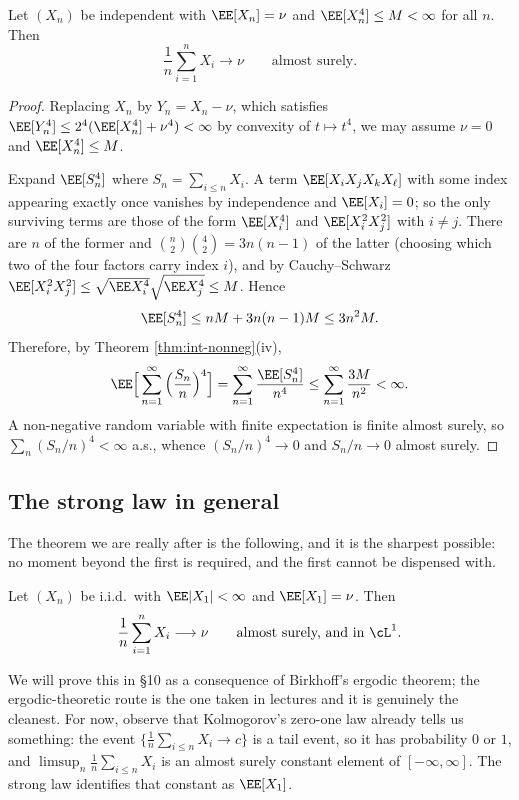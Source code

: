 \begin{theorem}\label{thm:slln4}
	Let $(X_n)$ be independent with $\EE[X_n]=\nu$ and $\EE[X_n^4]\leq M<\infty$ for all $n$. Then
	$$
	\frac{1}{n}\sum_{i=1}^n X_i \longrightarrow \nu \qquad \text{almost surely.}
	$$
\end{theorem}
\begin{proof}
	Replacing $X_n$ by $Y_n = X_n - \nu$, which satisfies $\EE[Y_n^4]\leq 2^4(\EE[X_n^4]+\nu^4)<\infty$ by convexity of $t \mapsto t^4$, we may assume $\nu=0$ and $\EE[X_n^4] \leq M$.

	Expand $\EE[S_n^4]$ where $S_n = \sum_{i\leq n}X_i$. A term $\EE[X_iX_jX_kX_\ell]$ with some index appearing exactly once vanishes by independence and $\EE[X_i]=0$; so the only surviving terms are those of the form $\EE[X_i^4]$ and $\EE[X_i^2X_j^2]$ with $i \neq j$. There are $n$ of the former and $\binom{n}{2}\binom{4}{2} = 3n(n-1)$ of the latter (choosing which two of the four factors carry index $i$), and by Cauchy--Schwarz $\EE[X_i^2X_j^2]\leq \sqrt{\EE X_i^4}\sqrt{\EE X_j^4}\leq M$. Hence
	$$
	\EE[S_n^4] \leq nM + 3n(n-1)M \leq 3n^2 M.
	$$
	Therefore, by Theorem \ref{thm:int-nonneg}(iv),
	$$
	\EE\Big[\sum_{n=1}^\infty \Big(\frac{S_n}{n}\Big)^4\Big] = \sum_{n=1}^\infty \frac{\EE[S_n^4]}{n^4} \leq \sum_{n=1}^\infty \frac{3M}{n^2}<\infty.
	$$
	A non-negative random variable with finite expectation is finite almost surely, so $\sum_n (S_n/n)^4 < \infty$ a.s., whence $(S_n/n)^4 \to 0$ and $S_n/n \to 0$ almost surely.
\end{proof}

\subsection{The strong law in general}

The theorem we are really after is the following, and it is the sharpest possible: no moment beyond the first is required, and the first cannot be dispensed with.

\begin{theorem}\label{thm:slln}
	Let $(X_n)$ be i.i.d.\ with $\EE|X_1|<\infty$ and $\EE[X_1]=\nu$. Then
	$$
	\frac1n\sum_{i=1}^n X_i \longrightarrow \nu \qquad \text{almost surely, and in } \cL^1.
	$$
\end{theorem}

We will prove this in \S10 as a consequence of Birkhoff's ergodic theorem; the ergodic-theoretic route is the one taken in lectures and it is genuinely the cleanest. For now, observe that Kolmogorov's zero-one law already tells us something: the event $\{\frac1n\sum_{i\leq n}X_i \to c\}$ is a tail event, so it has probability $0$ or $1$, and $\limsup_n \frac1n\sum_{i\leq n}X_i$ is an almost surely constant element of $[-\infty,\infty]$. The strong law identifies that constant as $\EE[X_1]$.


